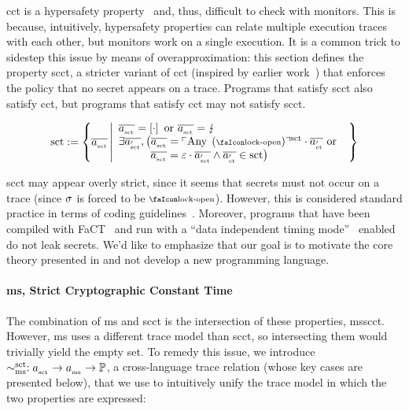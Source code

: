 \gls*{cct} is a hypersafety property~\cite{barthe2018sec} and, thus, difficult to check with monitors.
This is because, intuitively, hypersafety properties can relate multiple execution traces with each other, but monitors work on a single execution.
It is a common trick to sidestep this issue by means of overapproximation: this section defines the property \gls*{scct}, a stricter variant of \gls*{cct} (inspired by earlier work~\cite{almeida2017jasmin}) that enforces the policy that no secret appears on a trace.
Programs that satisfy \gls*{scct} also satisfy \gls*{cct}, but programs that satisfy \gls*{cct} may not satisfy \gls*{scct}.

\begin{definition}{}
  \noindent\[
  \scctsafe:=\left\{\scctTrace 
      \left|
        \begin{array}{l}
          \scctTrace=\hole{\cdot} \text{ or } \scctTrace=\lightning \\
          \exists\scctTrace['],\left(\scctTrace=\scctAny[\unlock]\cdot\varTrace[_{\ctsafe}'] \text{ or } \right.\\
          \hspace{2.8em}\left.\scctTrace=\emptyevent\cdot\scctTrace[']
          \wedge \varTrace[_{\ctsafe}']\in\scctsafe \right)
        \end{array}
      \right.
    \right\}
  \]
\end{definition}

\gls*{scct} may appear overly strict, since it seems that secrets must not occur on a trace (since $\sigma_{}$ is forced to be $\unlock$). 
However, this is considered standard practice in terms of coding guidelines~\cite{ctguidelines}.
Moreover, programs that have been compiled with FaCT~\cite{cauligi2019fact} and run with a ``data independent timing mode''~\cite{arm-refman,intel-refman} enabled do not leak secrets. 
We'd like to emphasize that our goal is to motivate the core theory presented in  and not develop a new programming language.

\paragraph{\gls*{ms}, Strict Cryptographic Constant Time}

The combination of \gls*{ms} and \gls*{scct} is the intersection of these properties, \gls*{msscct}.
However, \gls*{ms} uses a different trace model than \gls*{scct}, so intersecting them would trivially yield the empty set. 
To remedy this issue, we introduce $\sim^{\text{sct}}_{\text{ms}} : a_{_{\text{sct}}} \to a_{_{\text{ms}}} \to \mathbb{P}$, a cross-language trace relation (whose key cases are presented below), that we use to intuitively unify the trace model in which the two properties are expressed:


